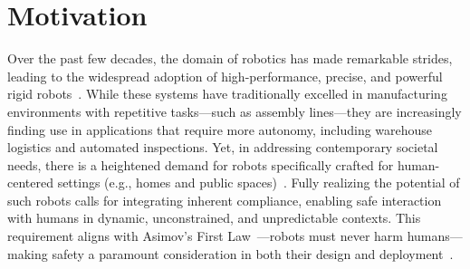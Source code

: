 \section{Motivation}\label{sec:introduction:motivation}

Over the past few decades, the domain of robotics has made remarkable strides, leading to the widespread adoption of high-performance, precise, and powerful rigid robots~\citep{todd1996fundamentals}. While these systems have traditionally excelled in manufacturing environments with repetitive tasks—such as assembly lines—they are increasingly finding use in applications that require more autonomy, including warehouse logistics and automated inspections. Yet, in addressing contemporary societal needs, there is a heightened demand for robots specifically crafted for human-centered settings (e.g., homes and public spaces)~\citep{nahavandi2019industry, chibani2013ubiquitous, royakkers2015literature, he2021challenges}. Fully realizing the potential of such robots calls for integrating inherent compliance, enabling safe interaction with humans in dynamic, unconstrained, and unpredictable contexts. This requirement aligns with Asimov’s First Law~\citep{asimov1941three}—robots must never harm humans—making safety a paramount consideration in both their design and deployment~\citep{villani2018survey}.


